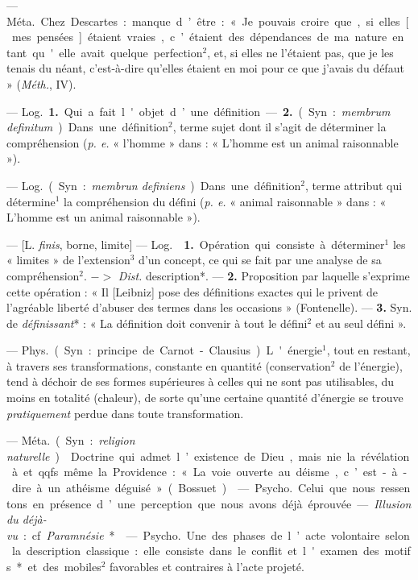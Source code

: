 \begin{itemize}[leftmargin=1cm, label=, itemsep=1pt]
 — \si{Méta.} Chez Descartes :
manque d’être : « Je pouvais croire
que, si elles [mes pensées] étaient
vraies, c’étaient des dépendances
de ma nature en tant qu'elle avait
quelque perfection$^2$, et, si elles ne
l’étaient pas, que je les tenais du
néant, c'est-à-dire qu’elles étaient
en moi pour ce que j'avais du défaut »
({\it Méth.}, IV).

 — \si{Log.} {\bf 1.} Qui a fait l'objet
d’une définition. — {\bf 2.} (Syn. : {\it membrum definitum}). Dans une définition$^2$, terme sujet dont il s’agit de
déterminer la compréhension ({\it p. e.}
« l'homme » dans : « L'homme est un
animal raisonnable »).

 — \si{Log.} (Syn. : {\it membrun
definiens}). Dans une définition$^2$,
terme attribut qui détermine$^1$ la
compréhension du défini ({\it p. e.} « animal raisonnable » dans : « L’homme
est un animal raisonnable »).

 — [L. {\it finis}, borne, limite]
— \si{Log.}  {\bf 1.} Opération qui consiste à
déterminer$^1$ les « limites » de l’extension$^3$ d’un concept, ce qui se fait par
une analyse de sa compréhension$^2$.
$->$ {\it Dist.} description*. — {\bf 2.}  Proposition par laquelle s’exprime cette
opération : « Il [Leibniz] pose des
définitions exactes qui le privent de
l’agréable liberté d’abuser des termes
dans les occasions » (Fontenelle). —
 {\bf 3.} Syn. de {\it définissant}* : « La définition doit convenir à tout le défini$^2$
et au seul défini ».

 — \si{Phys.}
(Syn. : principe de Carnot-Clausius).
L'énergie$^1$, tout en restant, à travers ses transformations, constante
en quantité (conservation$^2$ de l’énergie), tend à déchoir de ses formes
supérieures à celles qui ne sont pas
utilisables, du moins en totalité
(chaleur), de sorte qu’une certaine
quantité d'énergie se trouve {\it pratiquement} perdue dans toute transformation.

 — \si{Méta.} (Syn. : {\it religion naturelle}).  Doctrine qui admet l’existence de Dieu, mais nie la révélation
à et qqfs. même la Providence : « La
voie ouverte au déisme, c’est-à-dire
à un athéisme déguisé » (Bossuet).

 — \si{Psycho.}
Celui que nous ressentons en présence d’une perception que nous
avons déjà éprouvée. — {\it Illusion du
déjà-vu} : cf. {\it Paramnésie}*.

 — \si{Psycho.} Une des
phases de l’acte volontaire selon la
description classique : elle consiste 
dans le conflit et l'examen des motifs* et des mobiles$^2$ favorables et
contraires à l’acte projeté.


\end{itemize}
